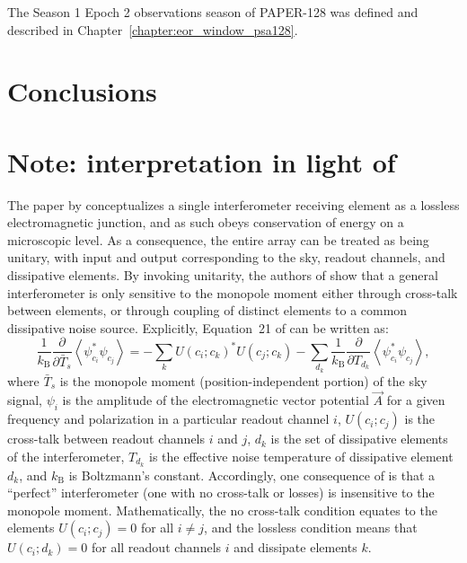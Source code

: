 The Season 1 Epoch 2 observations season of PAPER-128 was defined and described in Chapter~\ref{chapter:eor_window_psa128}. 


\section{Conclusions}

\section*{Note: interpretation in light of \cite{Venumadhav.16}}
The paper by \citealt{Venumadhav.16} conceptualizes a single
interferometer receiving element as a lossless electromagnetic junction, and as
such obeys conservation of energy on a microscopic level. As a consequence, the
entire array can be treated as being unitary, with input and output
corresponding to the sky, readout channels, and dissipative elements. By
invoking unitarity, the authors of \citealt{Venumadhav.16} show that a general interferometer is
only sensitive to the monopole moment either through cross-talk between
elements, or through coupling of distinct elements to a common dissipative noise
source. Explicitly, Equation~21 of \citealt{Venumadhav.16} can be written as:
\begin{equation}
\frac{1}{k_\mathrm{B}} \frac{\partial}{\partial\bar{T}_s} \left\langle\psi_{c_i}^* \psi_{c_j}\right\rangle =
- \sum_k U(c_i; c_k)^* U(c_j; c_k) - \sum_{d_k} \frac{1}{k_\mathrm{B}} \frac{\partial}{\partial T_{d_k}} \left\langle\psi_{c_i}^* \psi_{c_j}\right\rangle, 
\label{eqn:21V16}
\end{equation}
where ${\bar{T}_s}$ is the monopole moment (position-independent portion) of the
sky signal, $\psi_i$ is the amplitude of the electromagnetic vector potential
$\vec{A}$ for a given frequency and polarization in a particular readout channel
$i$, $U(c_i; c_j)$ is the cross-talk between readout channels $i$ and $j$, $d_k$
is the set of dissipative elements of the interferometer, $T_{d_k}$ is the
effective noise temperature of dissipative element $d_k$, and $k_\mathrm{B}$ is
Boltzmann's constant. Accordingly, one consequence of \citealt{Venumadhav.16} is that a ``perfect''
interferometer (one with no cross-talk or losses) is insensitive to the monopole
moment. Mathematically, the no cross-talk condition equates to the elements
$U(c_i; c_j) = 0$ for all $i \neq j$, and the lossless condition means that
$U(c_i; d_k) = 0$ for all readout channels $i$ and dissipate elements $k$.


